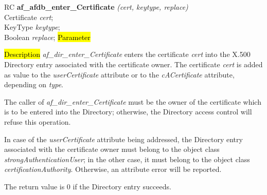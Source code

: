 RC {\bf af\_afdb\_enter\_Certificate} {\em (cert, keytype, replace)} \\
Certificate {\em *cert}; \\
KeyType {\em keytype}; \\
Boolean {\em replace};
\hl{Parameter}




\hl{Description}
{\em af\_dir\_enter\_Certificate} enters the certificate {\em cert} into the X.500 Directory 
entry associated with the certificate owner. The certificate {\em cert} is added as value
to the {\em userCertificate} attribute or to the {\em cACertificate} attribute,
depending on {\em type}.

The caller of {\em af\_dir\_enter\_Certificate} must be the owner of the certificate 
which is to be entered into the Directory; otherwise, the Directory access 
control will refuse this operation.

In case of the {\em userCertificate} attribute being addressed, the Directory entry
associated with the certificate owner must belong to the object class
{\em strongAuthenticationUser}; in the other case, it must belong to the
object class {\em certificationAuthority}. Otherwise, an attribute error will be
reported.

The return value is 0 if the Directory entry succeeds.

